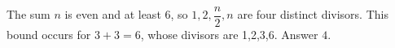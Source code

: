 The sum $n$ is even and at least 6, so $1,2,\dfrac{n}{2},n$ are four distinct divisors. This bound occurs for $3+3=6$, whose divisors are 1,2,3,6. Answer $\boxed4$.
